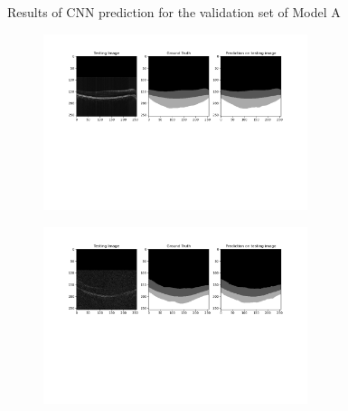 \documentclass[12pt,a4paper]{scrartcl}
\begin{document}
\begin{figure}
\begin{subfigure}{1\textwidth}
    \caption{}
    \label{fig:results:A:c}
   \end{subfigure}
   \caption{Results of CNN prediction for the validation set of Model A}
  \label{Results}
\end{figure}

\begin{figure} 
   \centering
   \begin{subfigure}{1\textwidth}
    \centering
    \includegraphics[trim= 100 250 80 0, clip, width=0.85\textwidth]{./images/results/B_syntethic_groundtruth_predictions29052021-081035_0.png}
    \caption{}
    \label{fig:results:B:a}
   \end{subfigure}
   \begin{subfigure}{1\textwidth}
    \centering
    \includegraphics[trim= 100 250 80 0, clip, width=0.85\textwidth]{./images/results/B_syntethic_groundtruth_predictions29052021-081035_4.png}
    \caption{}
    \label{fig:results:B:b}
   \end{subfigure}
    \begin{subfigure}{1\textwidth}
    \centering

\end{subfigure}
\end{figure}
\end{document}
